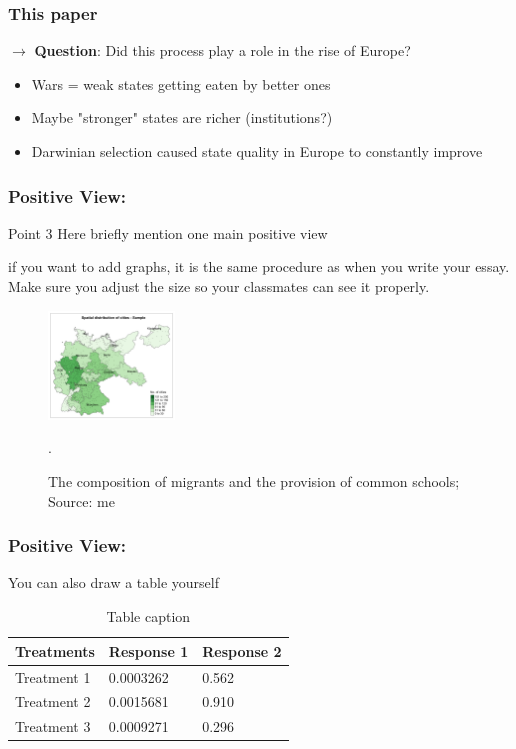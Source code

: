\documentclass{beamer}
\begin{document}
\begin{frame}
\frametitle{This paper}
\justifying
$\rightarrow$ \textbf{Question}: 
Did this process play a role in the rise of Europe?
\medskip
\begin{itemize}
\item Wars = weak states getting eaten by better ones
\item Maybe "stronger" states are richer (institutions?) 
\item Darwinian selection caused state quality in Europe to constantly improve
\end{itemize}

\end{frame}



\begin{frame}
\frametitle{Positive View: }

\begin{block}{Point 3}
Here briefly mention one main positive view
\end{block}

if you want to add graphs, it is the same procedure as when you write your essay. Make sure you adjust the size so your classmates can see it properly.
\begin{figure}[hbt!]
    \centering
    \includegraphics[width=0.3\textwidth]{paper/output/descriptive/map_cities_sample.png}
    \caption{The composition of migrants and the provision of common schools; Source: me}.
    \label{table:my_label}
\end{figure}

\end{frame}


\begin{frame}
\frametitle{Positive View: }
You can also draw a table yourself

\begin{table}
\begin{tabular}{l l l}
\toprule
\textbf{Treatments} & \textbf{Response 1} & \textbf{Response 2}\\
\midrule
Treatment 1 & 0.0003262 & 0.562 \\
Treatment 2 & 0.0015681 & 0.910 \\
Treatment 3 & 0.0009271 & 0.296 \\
\bottomrule
\end{tabular}
\caption{Table caption}
\end{table}

\end{frame}
\end{document}
